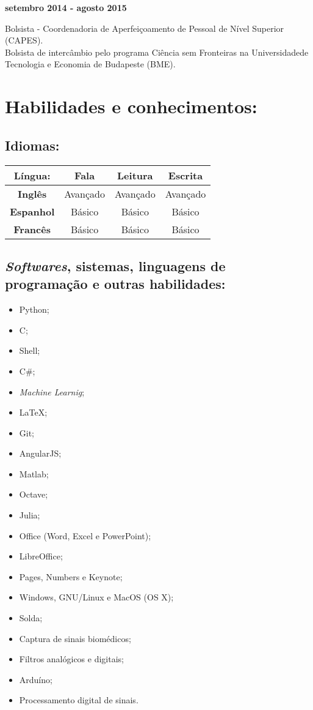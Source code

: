 \documentclass[11pt]{article}
\begin{document}
    \textbf{setembro 2014 - agosto 2015}
    \begin{addmargin}{0.5cm}
        Bolsista - Coordenadoria de Aperfeiçoamento de Pessoal de Nível Superior (CAPES). \\
        Bolsista de intercâmbio pelo programa Ciência sem Fronteiras na Universidadede Tecnologia e Economia de Budapeste (BME). 
\end{addmargin}

\section{Habilidades e conhecimentos:}

\subsection{Idiomas:}
\begin{center}
\begin{tabular}{c | c | c | c}
\hline
\textbf{Língua:} & Fala & Leitura & Escrita \\
\hline
\hline
\textbf{Inglês} &  Avançado & Avançado & Avançado  \\
\hline
\textbf{Espanhol} & Básico & Básico & Básico \\
\hline
\textbf{Francês} & Básico & Básico & Básico \\
\hline
\end{tabular}
\end{center}

\subsection{\textit{Softwares}, sistemas, linguagens de programação e outras habilidades:}
\begin{multicols}{3} %
\begin{itemize}
    \item Python;
    \item C;
    \item Shell;
    \item C\#;
    \item \textit{Machine Learnig};
    \item \LaTeX ;
    \item Git;
    \item AngularJS;
    \item Matlab;
    \item Octave;
    \item Julia;
    \item Office (Word, Excel e PowerPoint);
    \item LibreOffice;
    \item Pages, Numbers e Keynote;
    \item Windows, GNU/Linux e MacOS (OS X);
    \item Solda;
    \item Captura de sinais biomédicos;
    \item Filtros analógicos e digitais;
    \item Arduíno;
    \item Processamento digital de sinais.
\end{itemize}
\end{multicols}
\end{document}
